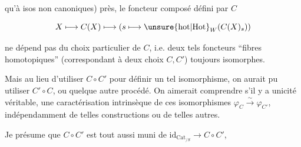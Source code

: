 
qu'à isos  non canoniques) près, le foncteur composé défini par $C$

\[
X\longmapsto C(X)\longmapsto (s\longmapsto\unsure{\mathrm{hot}|\mathrm{Hot}}_W(C(X)_s))
\]


ne dépend pas du choix particulier de $C$, i.e. deux tels foncteurs ``fibres homotopiques'' (correspondant à deux choix $C,C'$)  toujours isomorphes.

Mais au lieu d'utiliser $C\circ C'$ pour définir un tel isomorphisme, on aurait pu utiliser $C'\circ C$, ou quelque autre procédé. On aimerait comprendre s'il y a unicité véritable, une caractérisation intrinsèque de ces isomorphismes $\varphi_C\xrightarrow{\sim}\varphi_{C'}$, indépendamment de telles constructions ou de telles autres.

Je présume que $C\circ C'$ est tout aussi muni de $\mathrm{id}_{\mathrm{Cat}_{/S}}\longrightarrow C\circ C'$,
